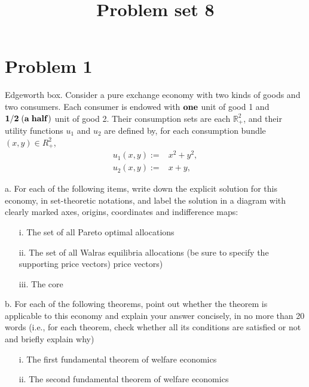 \documentclass[12pt,notitlepage]{article}%
\numberwithin{equation}{section}
\begin{document}
\title{Problem set 8%
		}


\maketitle


\section{Problem 1}

Edgeworth box. Consider a pure exchange economy with two kinds of goods and two consumers. Each consumer is endowed with $\bf{one}$ unit of good 1 and $\bf{1/2}\;(a \;half)$ unit of good 2. Their consumption sets are each $\mathbb R_{+}^2$, and their utility functions $u_1$ and $u_2$ are defined by, for each consumption bundle $(x,y)\in R_{+}^2$, 
\begin{equation}
\begin{split}
u_1(x,y):=&x^2+y^2,\\
u_2(x,y):=&x+y,
\end{split}
\end{equation}

	
	
	a. For each of the following items, write down the explicit solution for this economy, in
set-theoretic notations, and label the solution in a diagram with clearly marked axes,
origins, coordinates and indifference maps:
\begin{itemize}
	\item[i.] The set of all Pareto optimal allocations
	\item[ii.] The set of all Walras equilibria allocations (be sure to specify the supporting price vectors)
price vectors)
\item[iii.] The core
	\end{itemize}


b. For each of the following theorems, point out whether the theorem is applicable to this
economy and explain your answer concisely, in no more than 20 words (i.e., for each
theorem, check whether all its conditions are satisfied or not and briefly explain why)
\begin{itemize}
	\item[i.] The first fundamental theorem of welfare economics
	\item[ii.] The second fundamental theorem of welfare economics
	\end{itemize}
	
	
	
	
	
\end{document}
